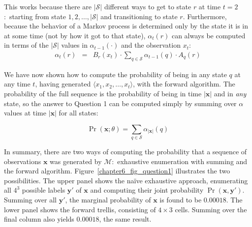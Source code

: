 \noindent This works because there are $|\mathcal{S}|$ different ways
to get to state $r$ at time $t=2$:\ starting from state
$1,2,\ldots,|\mathcal{S}|$ and transitioning to state $r$.
Furthermore, because the behavior of a Markov process is determined
only by the state it is in at some time (not by how it got to that
state), $\alpha_t(r)$ can always be computed in terms of the
$|\mathcal{S}|$ values in $\alpha_{t-1}(\cdot)$ and the observation
$x_t$:
\begin{eqnarray}
\alpha_t(r) & = & B_r(x_t) \cdot \sum_{q \in \mathcal{S}} \alpha_{t-1}(q) \cdot A_q(r)
\end{eqnarray}

\noindent We have now shown how to compute the probability of being in
any state $q$ at any time $t$, having generated $\langle x_1, x_2,
\ldots , x_t \rangle$, with the forward algorithm.  The probability of
the full sequence is the probability of being in time $|\textbf{x}|$
and in \emph{any} state, so the answer to Question 1 can be computed
simply by summing over $\alpha$ values at time $|\textbf{x}|$ for all
states:

\begin{equation}
\Pr(\textbf{x};\theta) = \sum_{q \in \mathcal{S}} \alpha_{|\textbf{x}|}(q)
\end{equation}

\noindent In summary, there are two ways of computing the probability
that a sequence of observations $\textbf{x}$ was generated by
$\mathcal{M}$:\ exhaustive enumeration with summing and the forward
algorithm.  Figure~\ref{chapter6_fig_question1} illustrates the two
possibilities.  The upper panel shows the na\"{i}ve exhaustive
approach, enumerating all $4^3$ possible labels $\textbf{y}'$ of
$\textbf{x}$ and computing their joint probability
$\Pr(\textbf{x},\textbf{y}')$.  Summing over all $\textbf{y}'$, the
marginal probability of $\textbf{x}$ is found to be $0.00018$. The
lower panel shows the forward trellis, consisting of $4 \times 3$
cells.  Summing over the final column also yields $0.00018$, the same
result.

